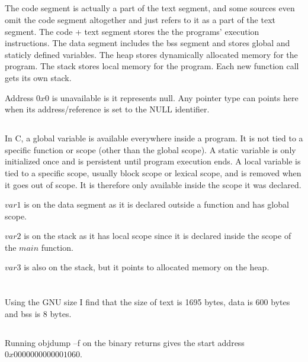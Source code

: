 \documentclass{article}
\begin{document}
\subsection{}
The code segment is actually a part of the text segment, and some sources even omit the code segment altogether and just refers to it as a part of the text segment. The code + text segment stores the the programs' execution instructions. The data segment includes the bss segment and stores global and staticly defined variables. The heap stores dynamically allocated memory for the program. The stack stores local memory for the program. Each new function call gets its own stack.

Address $0x0$ is unavailable is it represents null. Any pointer type can points here when its address/reference is set to the NULL identifier.

\subsection{}
In C, a global variable is available everywhere inside a program. It is not tied to a specific function or scope (other than the global scope). A static variable is only initialized once and is persistent until program execution ends. A local variable is tied to a specific scope, usually block scope or lexical scope, and is removed when it goes out of scope. It is therefore only available inside the scope it was declared. 

$var1$ is on the data segment as it is declared outside a function and has global scope. 

$var2$ is on the stack as it has local scope since it is declared inside the scope of the $main$ function. 

$var3$ is also on the stack, but it points to allocated memory on the heap.

\section{}
\subsection{}
Using the GNU size I find that the size of text is 1695 bytes, data is 600 bytes and bss is 8 bytes. 

\subsection{}
Running objdump –f on the binary returns gives the start address $0x0000000000001060$.
\end{document}
